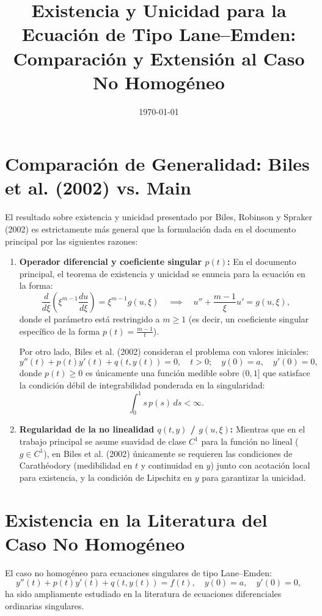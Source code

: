 \documentclass[12pt,a4paper]{article}
\title{Existencia y Unicidad para la Ecuación de Tipo Lane--Emden: Comparación y Extensión al Caso No Homogéneo}
\author{}
\date{\today}
\begin{document}
\maketitle

\section{Comparación de Generalidad: Biles et al. (2002) vs. Main}

El resultado sobre existencia y unicidad presentado por Biles, Robinson y Spraker (2002) es estrictamente más general que la formulación dada en el documento principal por las siguientes razones:

\begin{enumerate}
    \item \textbf{Operador diferencial y coeficiente singular $p(t)$:}
    En el documento principal, el teorema de existencia y unicidad se enuncia para la ecuación en la forma:
    \[
    \frac{d}{d\xi}\left( \xi^{m-1} \frac{du}{d\xi} \right) = \xi^{m-1} g(u, \xi) \quad \implies \quad u'' + \frac{m-1}{\xi} u' = g(u, \xi),
    \]
    donde el parámetro está restringido a $m \ge 1$ (es decir, un coeficiente singular específico de la forma $p(t) = \frac{m-1}{t}$).
    
    Por otro lado, Biles et al. (2002) consideran el problema con valores iniciales:
    \[
    y''(t) + p(t) y'(t) + q(t, y(t)) = 0, \quad t > 0; \quad y(0) = a, \quad y'(0) = 0,
    \]
    donde $p(t) \ge 0$ es únicamente una función medible sobre $(0, 1]$ que satisface la condición débil de integrabilidad ponderada en la singularidad:
    \[
    \int_0^1 s \, p(s) \, ds < \infty.
    \]

    \item \textbf{Regularidad de la no linealidad $q(t, y)$ / $g(u, \xi)$:}
    Mientras que en el trabajo principal se asume suavidad de clase $C^1$ para la función no lineal ($g \in C^1$), en Biles et al. (2002) únicamente se requieren las condiciones de Carathéodory (medibilidad en $t$ y continuidad en $y$) junto con acotación local para existencia, y la condición de Lipschitz en $y$ para garantizar la unicidad.
\end{enumerate}

\section{Existencia en la Literatura del Caso No Homogéneo}

El caso no homogéneo para ecuaciones singulares de tipo Lane--Emden:
\[
y''(t) + p(t) y'(t) + q(t, y(t)) = f(t), \quad y(0) = a, \quad y'(0) = 0,
\]
ha sido ampliamente estudiado en la literatura de ecuaciones diferenciales ordinarias singulares.
\end{document}
